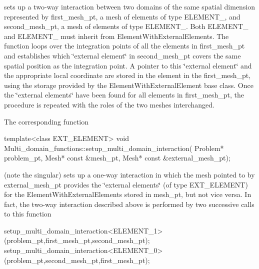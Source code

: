 sets up a two-\/way interaction between two domains of the same spatial dimension represented by {\ttfamily first\+\_\+mesh\+\_\+pt}, a mesh of elements of type {\ttfamily E\+L\+E\+M\+E\+N\+T\+\_}, and {\ttfamily second\+\_\+mesh\+\_\+pt}, a mesh of elements of type {\ttfamily E\+L\+E\+M\+E\+N\+T\+\_}. Both {\ttfamily E\+L\+E\+M\+E\+N\+T\+\_} and {\ttfamily E\+L\+E\+M\+E\+N\+T\+\_} must inherit from {\ttfamily Element\+With\+External\+Elements}. The function loops over the integration points of all the elements in {\ttfamily first\+\_\+mesh\+\_\+pt} and establishes which \char`\"{}external element\char`\"{} in {\ttfamily second\+\_\+mesh\+\_\+pt} covers the same spatial position as the integration point. A pointer to this \char`\"{}external element\char`\"{} and the appropriate local coordinate are stored in the element in the {\ttfamily first\+\_\+mesh\+\_\+pt}, using the storage provided by the {\ttfamily Element\+With\+External\+Element} base class. Once the \char`\"{}external elements\char`\"{} have been found for all elements in {\ttfamily first\+\_\+mesh\+\_\+pt}, the procedure is repeated with the roles of the two meshes interchanged.

The corresponding function


\begin{DoxyCode}
\textcolor{keyword}{template}<\textcolor{keyword}{class} EXT\_ELEMENT>
\textcolor{keywordtype}{void} Multi\_domain\_functions::setup\_multi\_domain\_interaction(
                                       Problem* problem\_pt,
                                       Mesh* \textcolor{keyword}{const} &mesh\_pt,
                                       Mesh* \textcolor{keyword}{const} &external\_mesh\_pt);
\end{DoxyCode}


(note the singular) sets up a one-\/way interaction in which the mesh pointed to by {\ttfamily external\+\_\+mesh\+\_\+pt} provides the \char`\"{}external
elements\char`\"{} (of type {\ttfamily E\+X\+T\+\_\+\+E\+L\+E\+M\+E\+NT}) for the {\ttfamily Element\+With\+External\+Elements} stored in {\ttfamily mesh\+\_\+pt}, but not vice versa. In fact, the two-\/way interaction described above is performed by two successive calls to this function


\begin{DoxyCode}
setup\_multi\_domain\_interaction<ELEMENT\_1>
     (problem\_pt,first\_mesh\_pt,second\_mesh\_pt);
setup\_multi\_domain\_interaction<ELEMENT\_0>
     (problem\_pt,second\_mesh\_pt,first\_mesh\_pt);
\end{DoxyCode}


